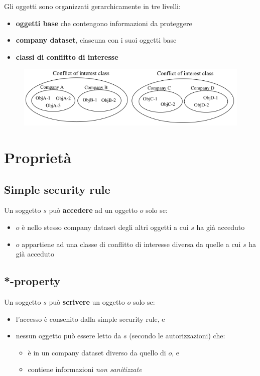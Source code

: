 \documentclass{report}
\begin{document}
\noindent Gli oggetti sono organizzati gerarchicamente in tre livelli:
\begin{itemize}
    \item \textbf{oggetti base} che contengono informazioni da proteggere 
    \item \textbf{company dataset}, ciascuna con i suoi oggetti base 
    \item \textbf{classi di conflitto di interesse}
\end{itemize}

\begin{figure}[H]
    \centering
    \includegraphics[width=0.8\linewidth]{images/cw.png}
\end{figure}

\section{Proprietà}

\subsection{Simple security rule}
Un soggetto $s$ può \textbf{accedere} ad un oggetto $o$ solo se:
\begin{itemize}
    \item $o$ è nello stesso company dataset degli altri oggetti a cui $s$ ha già acceduto 
    \item $o$ appartiene ad una classe di conflitto di interesse diversa da quelle a cui $s$ ha già acceduto
\end{itemize}


\subsection{*-property}
Un soggetto $s$ può \textbf{scrivere} un oggetto $o$ solo se:
\begin{itemize}
    \item l'accesso è consenito dalla simple security rule, e 
    \item nessun oggetto può essere letto da $s$ (secondo le autorizzazioni) che:
    \begin{itemize}
        \item è in un company dataset diverso da quello di $o$, e 
        \item contiene informazioni \textit{non sanitizzate}
    \end{itemize}
\end{itemize}
\end{document}
